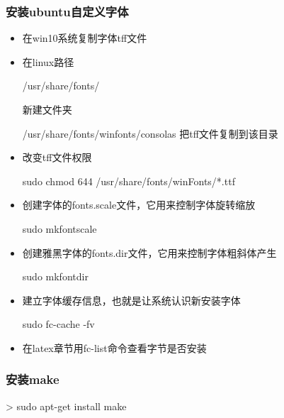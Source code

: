 \subsubsection{安装ubuntu自定义字体}
\begin{itemize}
\item 在win10系统复制字体tff文件

\item  在linux路径
\begin{messagebox}
/usr/share/fonts/
\end{messagebox}
新建文件夹
\begin{messagebox}
/usr/share/fonts/winfonts/consolas
把tff文件复制到该目录
\end{messagebox}

\item 改变tff文件权限
\begin{commandbox}
sudo chmod 644 /usr/share/fonts/winFonts/*.ttf
\end{commandbox}

\item 创建字体的fonts.scale文件，它用来控制字体旋转缩放
\begin{commandbox}
sudo mkfontscale
\end{commandbox}

\item 创建雅黑字体的fonts.dir文件，它用来控制字体粗斜体产生
\begin{commandbox}
sudo mkfontdir
\end{commandbox}

\item 建立字体缓存信息，也就是让系统认识新安装字体
\begin{commandbox}
sudo fc-cache -fv
\end{commandbox}

\item 在latex章节用fc-list命令查看字节是否安装

\end{itemize}

\subsubsection{安装make}
\begin{commandbox}
 > sudo apt-get install make
\end{commandbox}

